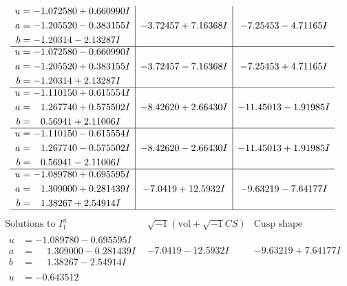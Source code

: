 \documentclass[1p]{elsarticle_modified}
\theoremstyle{definition}
\newcommand{\I}{\sqrt{-1}}
\begin{document}
$$\begin{array}{c|c|c}
\begin{aligned}
u &= -1.072580 + 0.660990 I \\
a &= -1.205520 - 0.383155 I \\
b &= -1.20314 - 2.13287 I\end{aligned}
 & -3.72457 + 7.16368 I & -7.25453 - 4.71165 I \\ \hline\begin{aligned}
u &= -1.072580 - 0.660990 I \\
a &= -1.205520 + 0.383155 I \\
b &= -1.20314 + 2.13287 I\end{aligned}
 & -3.72457 - 7.16368 I & -7.25453 + 4.71165 I \\ \hline\begin{aligned}
u &= -1.110150 + 0.615554 I \\
a &= \phantom{-}1.267740 + 0.575502 I \\
b &= \phantom{-}0.56941 + 2.11006 I\end{aligned}
 & -8.42620 + 2.66430 I & -11.45013 - 1.91985 I \\ \hline\begin{aligned}
u &= -1.110150 - 0.615554 I \\
a &= \phantom{-}1.267740 - 0.575502 I \\
b &= \phantom{-}0.56941 - 2.11006 I\end{aligned}
 & -8.42620 - 2.66430 I & -11.45013 + 1.91985 I \\ \hline\begin{aligned}
u &= -1.089780 + 0.695595 I \\
a &= \phantom{-}1.309000 + 0.281439 I \\
b &= \phantom{-}1.38267 + 2.54914 I\end{aligned}
 & -7.0419 + 12.5932 I & -9.63219 - 7.64177 I\\
 \hline 
 \end{array}$$\newpage$$\begin{array}{c|c|c}  
\text{Solutions to }I^u_{1}& \I (\text{vol} + \sqrt{-1}CS) & \text{Cusp shape}\\
 \hline 
\begin{aligned}
u &= -1.089780 - 0.695595 I \\
a &= \phantom{-}1.309000 - 0.281439 I \\
b &= \phantom{-}1.38267 - 2.54914 I\end{aligned}
 & -7.0419 - 12.5932 I & -9.63219 + 7.64177 I \\ \hline\begin{aligned}
u &= -0.643512\phantom{ +0.000000I} \\

\end{aligned}
\end{array}$$
\end{document}
